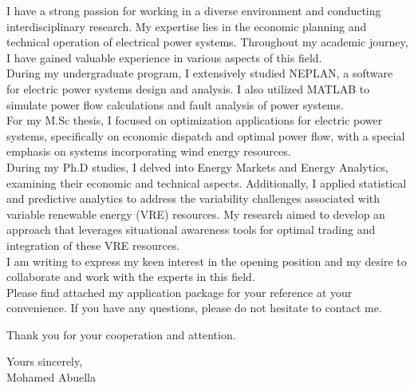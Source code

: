\documentclass[11pt,letterpaper,sans]{moderncv}   %
\begin{document}
I have a strong passion for working in a diverse environment and conducting interdisciplinary research. My expertise lies in the economic planning and technical operation of electrical power systems. Throughout my academic journey, I have gained valuable experience in various aspects of this field.\\

During my undergraduate program, I extensively studied NEPLAN, a software for electric power systems design and analysis. I also utilized MATLAB to simulate power flow calculations and fault analysis of power systems.\\

For my M.Sc thesis, I focused on optimization applications for electric power systems, specifically on economic dispatch and optimal power flow, with a special emphasis on systems incorporating wind energy resources.\\

During my Ph.D studies, I delved into Energy Markets and Energy Analytics, examining their economic and technical aspects. Additionally, I applied statistical and predictive analytics to address the variability challenges associated with variable renewable energy (VRE) resources. My research aimed to develop an approach that leverages situational awareness tools for optimal trading and integration of these VRE resources.\\

I am writing to express my keen interest in the opening position and my desire to collaborate and work with the experts in this field.\\

Please find attached my application package for your reference at your convenience. If you have any questions, please do not hesitate to contact me.

Thank you for your cooperation and attention.


Yours sincerely, \\
Mohamed Abuella



\clearpage
\end{document}
